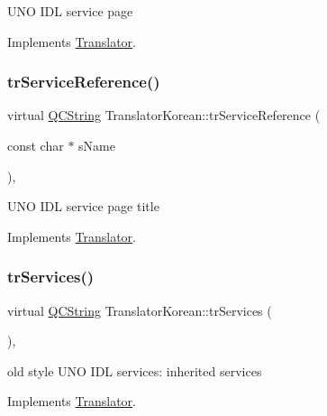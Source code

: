 U\+NO I\+DL service page 

Implements \mbox{\hyperlink{class_translator}{Translator}}.

\mbox{\label{class_translator_korean_a2d8fa72d812093e7ef7017014bba60f2}} 
\subsubsection{\texorpdfstring{trServiceReference()}{trServiceReference()}}
{\footnotesize\ttfamily virtual \mbox{\hyperlink{class_q_c_string}{Q\+C\+String}} Translator\+Korean\+::tr\+Service\+Reference (\begin{DoxyParamCaption}\item[{const char $\ast$}]{s\+Name }\end{DoxyParamCaption})\hspace{0.3cm}{\ttfamily [inline]}, {\ttfamily [virtual]}}

U\+NO I\+DL service page title 

Implements \mbox{\hyperlink{class_translator}{Translator}}.

\mbox{\label{class_translator_korean_a650db331250ec35f164e9a8c7763ca22}} 
\subsubsection{\texorpdfstring{trServices()}{trServices()}}
{\footnotesize\ttfamily virtual \mbox{\hyperlink{class_q_c_string}{Q\+C\+String}} Translator\+Korean\+::tr\+Services (\begin{DoxyParamCaption}{ }\end{DoxyParamCaption})\hspace{0.3cm}{\ttfamily [inline]}, {\ttfamily [virtual]}}

old style U\+NO I\+DL services\+: inherited services 

Implements \mbox{\hyperlink{class_translator}{Translator}}.

\mbox{\label{class_translator_korean_a8e7c61f844a33dda5bd8f78e3703c939}} 
